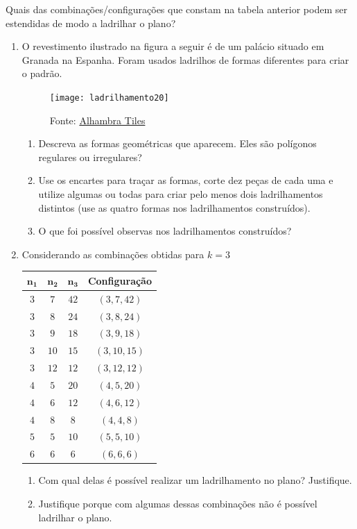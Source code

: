 Quais das combinações/configurações que constam na tabela anterior podem ser estendidas de modo a ladrilhar o plano?

\exercise

\begin{enumerate}

\item O revestimento ilustrado na figura a seguir é de um palácio situado em Granada na Espanha. Foram usados ladrilhos de formas diferentes para criar o padrão.

\begin{figure}[H]
\centering
\texttt{[image: ladrilhamento20]}

\caption{Fonte: \href{https://alhambratiles.co.uk/collections/granada-range/products/granada-tiles-comares}{Alhambra Tiles}}
\end{figure}

\begin{enumerate}
\item Descreva as formas geométricas que aparecem. Eles são polígonos regulares ou irregulares?
\item Use os encartes para traçar as formas, corte dez peças de cada uma e utilize algumas ou todas para criar pelo menos dois ladrilhamentos distintos (use as quatro formas nos ladrilhamentos construídos).
\item O que foi possível observas nos ladrilhamentos construídos?
\end{enumerate}


	\item Considerando as combinações obtidas para $k=3$
	\begin{table}[H]
	\centering
	\begin{tabu} to \textwidth{|c|c|c|c|}
	\hline
	\thead
	$\bm{n_1}$ & $\bm{n_2}$ & $\bm{n_3}$ & Configuração \\
	\hline
	$3$ & $7$ & $42$ & $(3,7,42)$ \\
	\hline
	$3$ & $8$ & $24$ & $(3,8,24)$ \\
	\hline
	$3$ & $9$ & $18$ & $(3,9,18)$ \\
	\hline
	$3$ & $10$ & $15$ & $(3,10,15)$ \\
	\hline
	$3$ & $12$ & $12$ & $(3,12,12)$ \\
	\hline
	$4$ & $5$ & $20$ & $(4,5,20)$ \\
	\hline
	$4$ & $6$ & $12$ & $(4,6,12)$ \\
	\hline
	$4$ & $8$ & $8$ & $(4,4,8)$ \\
	\hline
	$5$ & $5$ & $10$ & $(5,5,10)$ \\
	\hline
	$6$ & $6$ & $6$ & $(6,6,6)$ \\
	\hline
	\end{tabu}
	\end{table}
	\begin{enumerate}
		\item Com qual delas é possível realizar um ladrilhamento no plano? Justifique.
		\item Justifique porque com algumas dessas combinações não é possível ladrilhar o plano.
	\end{enumerate}


\end{enumerate}
